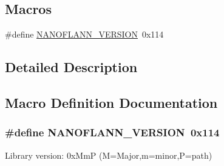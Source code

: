 \subsection*{Macros}
\begin{DoxyCompactItemize}
\item 
\#define \hyperlink{group__nanoflann__grp_ga7b8efca796d8e1861a432a5f6b8404a1}{N\-A\-N\-O\-F\-L\-A\-N\-N\-\_\-\-V\-E\-R\-S\-I\-O\-N}~0x114
\end{DoxyCompactItemize}


\subsection{Detailed Description}


\subsection{Macro Definition Documentation}
\hypertarget{group__nanoflann__grp_ga7b8efca796d8e1861a432a5f6b8404a1}{
\subsubsection[{N\-A\-N\-O\-F\-L\-A\-N\-N\-\_\-\-V\-E\-R\-S\-I\-O\-N}]{\setlength{\rightskip}{0pt plus 5cm}\#define N\-A\-N\-O\-F\-L\-A\-N\-N\-\_\-\-V\-E\-R\-S\-I\-O\-N~0x114}}\label{group__nanoflann__grp_ga7b8efca796d8e1861a432a5f6b8404a1}
Library version\-: 0x\-Mm\-P (M=Major,m=minor,P=path) 